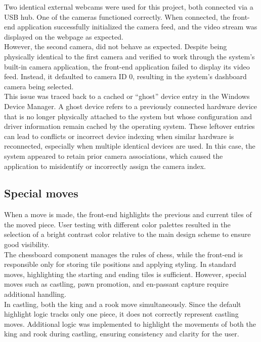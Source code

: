 Two identical external webcams were used for this project, both connected via a USB hub. One of the cameras functioned correctly. When connected, the front-end application successfully initialized the camera feed, and the video stream was displayed on the webpage as expected.\\

However, the second camera, did not behave as expected. Despite being physically identical to the first camera and verified to work through the system's built-in camera application, the front-end application failed to display its video feed. Instead, it defaulted to camera ID 0, resulting in the system's dashboard camera being selected.\\

This issue was traced back to a cached or “ghost” device entry in the Windows Device Manager. A ghost device refers to a previously connected hardware device that is no longer physically attached to the system but whose configuration and driver information remain cached by the operating system. These leftover entries can lead to conflicts or incorrect device indexing when similar hardware is reconnected, especially when multiple identical devices are used. In this case, the system appeared to retain prior camera associations, which caused the application to misidentify or incorrectly assign the camera index.

\subsection{Special moves}
When a move is made, the front-end highlights the previous and current tiles of the moved piece. User testing with different color palettes resulted in the selection of a bright contrast color relative to the main design scheme to ensure good visibility. \\

The chessboard component manages the rules of chess, while the front-end is responsible only for storing tile positions and applying styling. In standard moves, highlighting the starting and ending tiles is sufficient. However, special moves such as \gls{castling}, pawn \gls{promotion}, and \gls{en-passant} capture require additional handling. \\

In \gls{castling}, both the king and a rook move simultaneously. Since the default highlight logic tracks only one piece, it does not correctly represent \gls{castling} moves. Additional logic was implemented to highlight the movements of both the king and rook during \gls{castling}, ensuring consistency and clarity for the user.


